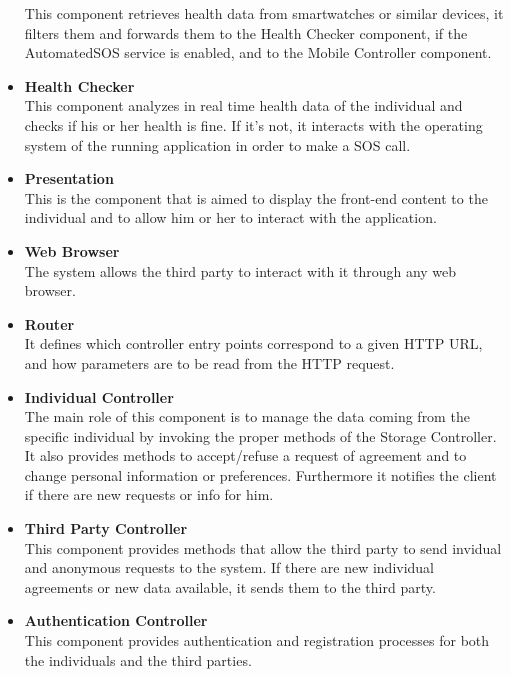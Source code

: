\begin{legal}
\begin{itemize}
{		This component retrieves health data from smartwatches or similar devices, it filters them and forwards them to the Health Checker component, if the AutomatedSOS service is enabled, and to the Mobile Controller component.
				}\\
		\item{\textbf{Health Checker}\\
		This component analyzes in real time health data of the individual and checks if his or her health is fine. If it's not, it interacts with the operating system of the running application in order to make a SOS call.
				}\\
		\item{\textbf{Presentation}\\
		This is the component that is aimed to display the front-end content to the individual and to allow him or her to interact with the application.
				}\\
		\item{\textbf{Web Browser}\\
		The system allows the third party to interact with it through any web browser.
				}\\
		\item{\textbf{Router}\\
		It defines which controller entry points correspond to a given HTTP URL, and how parameters are to be read from the HTTP request.
				}\\
		\item{\textbf{Individual Controller}\\
		The main role of this component is to manage the data coming from the specific individual by invoking the proper methods of the Storage Controller. It also provides methods to accept/refuse a request of agreement and to change personal information or preferences. Furthermore it notifies the client if there are new requests or info for him.
				}\\
		\item{\textbf{Third Party Controller}\\
		This component provides methods that allow the third party to send invidual and anonymous requests to the system. If there are new individual agreements or new data available, it sends them to the third party.
				}\\
		\item{\textbf{Authentication Controller}\\
		This component provides authentication and registration processes for both the individuals and the third parties.
}
\end{itemize}
\end{legal}

